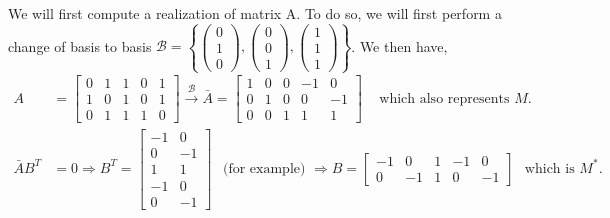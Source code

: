 \documentclass[a4paper, 10pt]{article}
\theoremstyle{definition} %
\begin{document}
We will first compute a realization of matrix A.
To do so, we will first perform a change of basis to basis $\mathcal{B} = \left\lbrace \left( \begin{array}{c} 0 \\ 1 \\ 0 \end{array} \right), \left( \begin{array}{c} 0 \\ 0 \\ 1 \end{array} \right), \left( \begin{array}{c} 1 \\ 1 \\ 1 \end{array} \right) \right\rbrace$. We then have,
\begin{equation*}
    \begin{split}
        A & = \left[
            \begin{array}{ccccc}
                0 & 1 & 1 & 0 & 1 \\
                1 & 0 & 1 & 0 & 1 \\
                0 & 1 & 1 & 1 & 0
            \end{array}
        \right]
        \overset{\mathcal{B}}{\longrightarrow}
        \bar{A} = \left[
            \begin{array}{ccccc}
                1 & 0 & 0 & -1 & 0 \\
                0 & 1 & 0 & 0 & -1 \\
                0 & 0 & 1 & 1 & 1
            \end{array}
        \right]
        \hspace{10pt} \text{ which also represents $M$.} \\[10pt]
        \bar{A}B^T & = 0 \Longrightarrow 
        B^T = \left[
            \begin{array}{cc}
                -1 & 0  \\
                0  & -1 \\
                1  & 1 \\
                -1 & 0 \\
                0 & -1
            \end{array}
        \right] \hspace{5pt} \text{ (for example) } \Longrightarrow
        B = \left[
            \begin{array}{ccccc}
                -1 & 0 & 1 & -1 & 0 \\
                0 & -1 & 1 & 0 & -1
            \end{array} 
        \right] \hspace{5pt} \text{ which is $M^*$.}
    \end{split}
\end{equation*}
\end{document}
